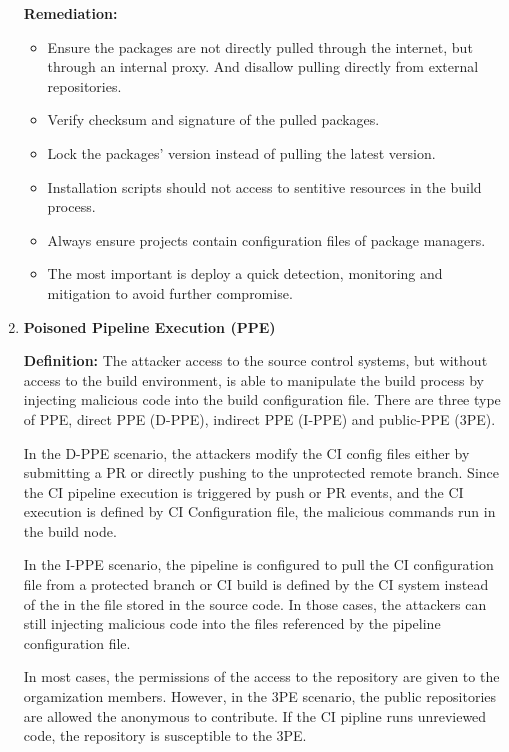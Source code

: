 \begin{enumerate}[label=(\arabic*)]
    \textbf{Remediation:}
        \begin{itemize}
            \item Ensure the packages are not directly pulled through the internet, but through an internal proxy. And 
            disallow pulling directly from external repositories.
            \item Verify checksum and signature of the pulled packages.
            \item Lock the packages' version instead of pulling the latest version.
            \item Installation scripts should not access to sentitive resources in the build process.
            \item Always ensure projects contain configuration files of package managers.
            \item The most important is deploy a quick detection, monitoring and mitigation to avoid further compromise.
        \end{itemize}
    \item \textbf{Poisoned Pipeline Execution (PPE)}

    \textbf{Definition: }
        The attacker access to the source control systems, but without access to the build environment, is
        able to manipulate the build process by injecting malicious code into the build configuration file.
        There are three type of PPE, direct PPE (D-PPE), indirect PPE (I-PPE) and public-PPE (3PE).

        In the D-PPE scenario, the attackers modify the CI config files either by submitting a PR or directly pushing to the unprotected
        remote branch. Since the CI pipeline execution is triggered by push or PR events, and the CI execution
        is defined by CI Configuration file, the malicious commands run in the build node.

        In the I-PPE scenario, the pipeline is configured to pull the CI configuration file from a protected 
        branch or CI build is defined by the CI system instead of the in the file stored in the source code.
        In those cases, the attackers can still injecting malicious code into the files referenced by the pipeline
        configuration file.

        In most cases, the permissions of the access to the repository are given to the orgamization
        members. However, in the 3PE scenario, the public repositories are allowed the anonymous to 
        contribute. If the CI pipline runs unreviewed code, the repository is susceptible to the 3PE.


\end{enumerate}
